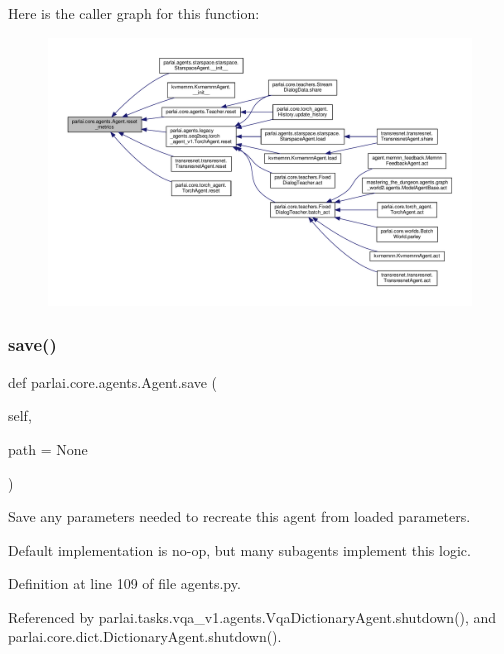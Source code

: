 Here is the caller graph for this function\+:
\nopagebreak
\begin{figure}[H]
\begin{center}
\leavevmode
\includegraphics[width=350pt]{classparlai_1_1core_1_1agents_1_1Agent_aaefcbd7c61d319b368b3ee13997c8c99_icgraph}
\end{center}
\end{figure}
\mbox{\label{classparlai_1_1core_1_1agents_1_1Agent_a51e706e3e5389c9b48c7a1589d97ec99}} 
\subsubsection{\texorpdfstring{save()}{save()}}
{\footnotesize\ttfamily def parlai.\+core.\+agents.\+Agent.\+save (\begin{DoxyParamCaption}\item[{}]{self,  }\item[{}]{path = {\ttfamily None} }\end{DoxyParamCaption})}

\begin{DoxyVerb}Save any parameters needed to recreate this agent from loaded parameters.

Default implementation is no-op, but many subagents implement this logic.
\end{DoxyVerb}
 

Definition at line 109 of file agents.\+py.



Referenced by parlai.\+tasks.\+vqa\+\_\+v1.\+agents.\+Vqa\+Dictionary\+Agent.\+shutdown(), and parlai.\+core.\+dict.\+Dictionary\+Agent.\+shutdown().

